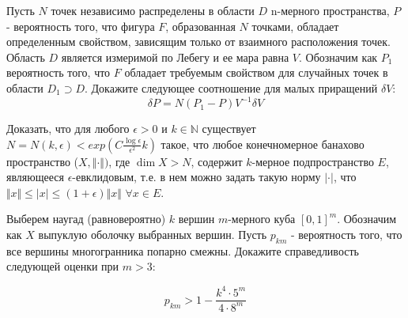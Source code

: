 \begin{problem}
Пусть  $N$ точек независимо распределены в области $D$ n-мерного пространства, $P$ - вероятность того, что фигура $F$, образованная $N$ точками, обладает определенным свойством,
зависящим только от взаимного расположения точек. Область $D$ является измеримой по Лебегу и ее мара равна $V$. Обозначим как $P_1$ вероятность того, что $F$ обладает требуемым свойством для случайных точек в области $D_1 \supset D$. Докажите следующее соотношение для малых приращений $\delta V$:
 \[
 \delta P = N (P_1 - P) V^{-1} \delta V
 \]  

\end{problem}



\begin{problem}
Доказать, что для любого $\epsilon > 0$ и $k \in \mathbb{N}$
существует $N = N(k, \epsilon) < exp(C\frac{\log \epsilon}{\epsilon^2}k)$ такое, что любое конечномерное банахово пространство ($X, \Vert\cdot\Vert)$, где $\dim X > N$, содержит $k$-мерное подпространство $E$, являющееся $\epsilon$-евклидовым, т.е. в нем можно задать такую норму $\vert \cdot \vert$, что $\Vert x \Vert \leqslant \vert x \vert \leqslant (1 + \epsilon) \Vert x \Vert$ $\forall x \in E$.     

\end{problem}

\begin{problem}
Выберем наугад (равновероятно) $k$ вершин $m$-мерного куба $[0,1]^m$. Обозначим как $X$ выпуклую оболочку выбранных вершин. Пусть $p_{km}$ - вероятность того, что все вершины многогранника попарно смежны. Докажите справедливость следующей оценки при $m > 3$:

\[
p_{km} > 1 - \frac{k^4 \cdot 5^m}{4 \cdot 8^m}
\]
    
\end{problem}
